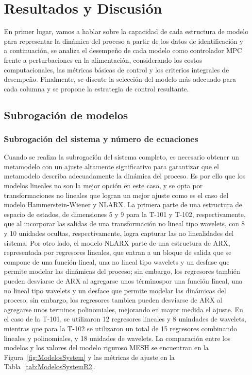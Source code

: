 \section{Resultados y Discusión}

En primer lugar, vamos a hablar sobre la capacidad de cada estructura de modelo para representar la dinámica del proceso a partir de los datos de identificación y a continuación, se analiza el desempeño de cada modelo como controlador MPC frente a perturbaciones en la alimentación, considerando los costos computacionales, las métricas básicas de control y los criterios integrales de desempeño. Finalmente, se discute la selección del modelo más adecuado para cada columna y se propone la estrategia de control resultante.

\subsection{Subrogación de modelos}

\subsubsection{Subrogación del sistema y número de ecuaciones}
Cuando se realiza la subrogación del sistema completo, es necesario obtener un metamodelo con un ajuste altamente significativo para garantizar que el metamodelo describa adecuadamente la dinámica del proceso. Es por ello que los modelos lineales no son la mejor opción en este caso, y se opta por transformaciones no lineales que logran un mejor ajuste como es el caso del modelo Hammerstein-Wiener y NLARX. La primera parte de una estructura de espacio de estados, de dimensiones 5 y 9 para la T-101 y T-102, respectivamente, que al incorporar las salidas de una transformación no lineal tipo wavelets, con 8 y 10 unidades ocultas, respectivamente, logra capturar las no linealidades del sistema. Por otro lado, el modelo NLARX parte de una estructura de ARX, representada por regresores lineales, que entran a un bloque de salida que se compone de una función lineal, una no lineal tipo wavelets y un desfase que permite modelar las dinámicas del proceso; sin embargo, los regresores también pueden desviarse de ARX al agregarse unos términospor una función lineal, una no lineal tipo wavelets y un desface que permite modelar las dinámicas del proceso; sin embargo, los regresores tambien pueden desviarse de ARX al agregarse unos terminos polinomiales, mejorando en mayor medida el ajuste. En el caso de la T-101, se utilizaron 12 regresores lineales y 8 unindades de wavelets, mientras que para la T-102 se utilizaron un total de 15 regresores combinando lineales y polinomiales, y 18 unidades de wavelets. La comparación entre los modelos y los valores del modelo riguroso MESH se encuentran en la Figura~\ref{fig:ModelosSystem} y las métricas de ajuste en la Tabla~\ref{tab:ModelosSystemR2}.

